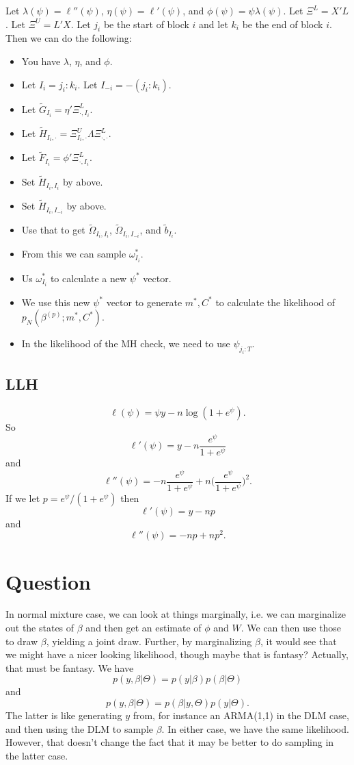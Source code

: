 \documentclass{article}
\begin{document}
Let $\lambda(\psi) = \ell''(\psi)$, $\eta(\psi) = \ell'(\psi)$, and $\phi(\psi)
= \psi \lambda(\psi)$.  Let $\Xi^L = X'L$.  Let $\Xi^U = L'X$.  Let $j_i$ be the
start of block $i$ and let $k_i$ be the end of block $i$.  Then we can do the
following:
\begin{itemize}
\item You have $\lambda$, $\eta$, and $\phi$.
\item Let $I_i = j_i:k_i$.  Let $I_{-i} = -(j_i:k_i)$.
\item Let $\tilde G_{I_i} = \eta' \Xi^L_{\cdot, I_i}$.
\item Let $\tilde H_{I_i,\cdot} = \Xi^U_{I_i,\cdot} \Lambda \Xi^L_{\cdot,
    \cdot}$.
\item Let $\tilde F_{I_i} = \phi' \Xi^L_{\cdot, I_i}$.
\item Set $\tilde H_{I_i, I_i}$ by above.
\item Set $\tilde H_{I_i, I_{-i}}$ by above.
\item Use that to get $\tilde \Omega_{I_i, I_i}$, $\tilde \Omega_{I_i, I_{-i}}$,
  and $\tilde b_{I_i}$.
\item From this we can sample $\omega_{I_i}^*$.
\item Us $\omega_{I_i}^*$ to calculate a new $\psi^*$ vector.
\item We use this new $\psi^*$ vector to generate $m^*, C^*$ to calculate the
  likelihood of $p_N(\beta^{(p)}; m^*, C^*)$.
\item In the likelihood of the MH check, we need to use $\psi_{j_i:T}$.
\end{itemize}

\subsection{LLH}

\[
\ell(\psi) = \psi y - n \log(1 + e^{\psi}).
\]
So
\[
\ell'(\psi) = y - n \frac{e^{\psi}}{1+e^{\psi}}
\]
and
\[
\ell''(\psi) = - n \frac{e^{\psi}}{1+e^{\psi}} + n \Big(\frac{e^{\psi}}{1+e^\psi}\Big)^2.
\]
If we let $p = e^{\psi} / (1 + e^{\psi})$ then
\[
\ell'(\psi) = y - n p
\]
and
\[
\ell''(\psi) = - n p + n p^2.
\]

\section{Question}

In normal mixture case, we can look at things marginally, i.e. we can
marginalize out the states of $\beta$ and then get an estimate of $\phi$ and
$W$.  We can then use those to draw $\beta$, yielding a joint draw.  Further, by
marginalizing $\beta$, it would see that we might have a nicer looking
likelihood, though maybe that is fantasy?  Actually, that must be fantasy.  We
have
\[
p(y, \beta | \Theta) = p(y | \beta) p(\beta | \Theta)
\]
and
\[
p(y, \beta | \Theta) = p(\beta | y, \Theta) p(y | \Theta).
\]
The latter is like generating $y$ from, for instance an ARMA(1,1) in the DLM
case, and then using the DLM to sample $\beta$.  In either case, we have the
same likelihood.  However, that doesn't change the fact that it may be better to
do sampling in the latter case.
\end{document}
